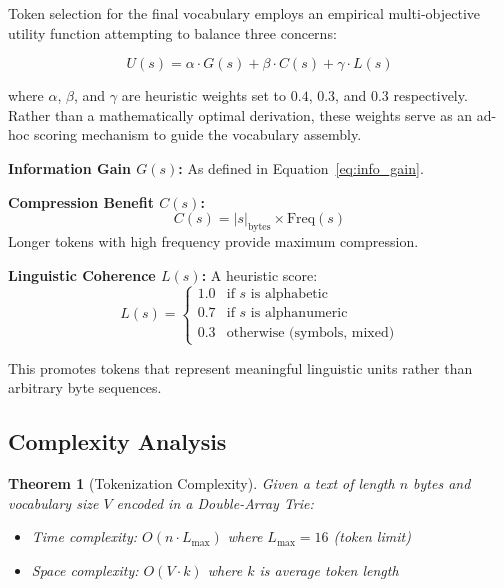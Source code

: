\documentclass[11pt,a4paper,twocolumn]{article}
\newtheorem{theorem}{Theorem}[section]
\begin{document}
Token selection for the final vocabulary employs an empirical multi-objective utility function attempting to balance three concerns:

\begin{equation}
U(s) = \alpha \cdot G(s) + \beta \cdot C(s) + \gamma \cdot L(s)
\label{eq:utility}
\end{equation}

where $\alpha$, $\beta$, and $\gamma$ are heuristic weights set to $0.4$, $0.3$, and $0.3$ respectively. Rather than a mathematically optimal derivation, these weights serve as an ad-hoc scoring mechanism to guide the vocabulary assembly.

\textbf{Information Gain $G(s)$:} As defined in Equation~\ref{eq:info_gain}.

\textbf{Compression Benefit $C(s)$:}
\begin{equation}
C(s) = |s|_{\text{bytes}} \times \text{Freq}(s)
\end{equation}
Longer tokens with high frequency provide maximum compression.

\textbf{Linguistic Coherence $L(s)$:} A heuristic score:
\begin{equation}
L(s) = \begin{cases}
1.0 & \text{if } s \text{ is alphabetic} \\
0.7 & \text{if } s \text{ is alphanumeric} \\
0.3 & \text{otherwise (symbols, mixed)}
\end{cases}
\end{equation}

This promotes tokens that represent meaningful linguistic units rather than arbitrary byte sequences.

\subsection{Complexity Analysis}

\begin{theorem}[Tokenization Complexity]
Given a text of length $n$ bytes and vocabulary size $V$ encoded in a Double-Array Trie:
\begin{itemize}
    \item Time complexity: $O(n \cdot L_{\max})$ where $L_{\max} = 16$ (token limit)
    \item Space complexity: $O(V \cdot k)$ where $k$ is average token length
\end{itemize}
\end{theorem}
\end{document}
